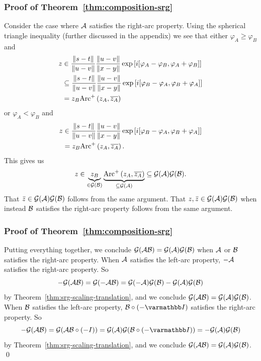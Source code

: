 \documentclass[10pt,mathserif]{beamer}
\begin{document}
\begin{frame}[plain]
\frametitle{Proof of Theorem~\ref{thm:composition-srg}}
Consider the case where ${\mathcal{A}}$ satisfies the right-arc property.
Using the spherical triangle inequality (further discussed in the appendix)
we see that either $\varphi_A\ge \varphi_B$ and 
\begin{align*}
z&\in \frac{\|s-t\|}{\|u-v\|}
\frac{\|u-v\|}{\|x-y\|}
\exp\left[i[\varphi_A-\varphi_B,\varphi_A+\varphi_B]\right]\\
&\subseteq
\frac{\|s-t\|}{\|u-v\|}
\frac{\|u-v\|}{\|x-y\|}
\exp\left[i[\varphi_B-\varphi_A,\varphi_B+\varphi_A]\right]\\
&=
z_B
\mathrm{Arc}^+\left(
z_A,\overline{z_A}
\right)
\end{align*}
or $\varphi_A< \varphi_B$ and 
\begin{align*}
z&\in 
\frac{\|s-t\|}{\|u-v\|}
\frac{\|u-v\|}{\|x-y\|}
\exp\left[i[\varphi_B-\varphi_A,\varphi_B+\varphi_A]\right]\\
&=z_B
\mathrm{Arc}^+\left(
z_A,\overline{z_A}
\right).
\end{align*}
This gives us
\vspace{-0.1in}
\[
z\in 
\underbrace{
z_B}_{\in {\mathcal{G}}({\mathcal{B}})}
\underbrace{\mathrm{Arc}^+\left(
z_A,\overline{z_A}\right)
}_{\subseteq  {\mathcal{G}}({\mathcal{A}})}
\subseteq {\mathcal{G}}({\mathcal{A}}){\mathcal{G}}({\mathcal{B}}).
\]
That $\bar{z}\in {\mathcal{G}}({\mathcal{A}}){\mathcal{G}}({\mathcal{B}})$ follows from the same argument.
That $z,\bar{z}\in {\mathcal{G}}({\mathcal{A}}){\mathcal{G}}({\mathcal{B}})$ when instead ${\mathcal{B}}$ satisfies the right-arc property follows from the same argument.
\end{frame}

\begin{frame}
\frametitle{Proof of Theorem~\ref{thm:composition-srg}}
Putting everything together, we conclude ${\mathcal{G}}({\mathcal{A}}{\mathcal{B}})= {\mathcal{G}}({\mathcal{A}}){\mathcal{G}}({\mathcal{B}})$
when ${\mathcal{A}}$ or ${\mathcal{B}}$ satisfies the right-arc property.
When ${\mathcal{A}}$ satisfies the left-arc property, $-{\mathcal{A}}$ satisfies the right-arc property.
So 
\[
-{\mathcal{G}}({\mathcal{A}}{\mathcal{B}})=
{\mathcal{G}}(-{\mathcal{A}}{\mathcal{B}})={\mathcal{G}}(-{\mathcal{A}}){\mathcal{G}}({\mathcal{B}})
-{\mathcal{G}}({\mathcal{A}}){\mathcal{G}}({\mathcal{B}})
\]
by Theorem~\ref{thm:srg-scaling-translation},
and we conclude ${\mathcal{G}}({\mathcal{A}}{\mathcal{B}})={\mathcal{G}}({\mathcal{A}}){\mathcal{G}}({\mathcal{B}})$.
When ${\mathcal{B}}$ satisfies the left-arc property,  $\cB\circ(-\opI)$ satisfies the right-arc property.
So 
\[
-\cG(\cA\cB)=
\cG(\cA\cB\circ(-I))=\cG(\cA)\cG(\cB\circ(-\opI))
=
-\cG(\cA)\cG(\cB)
\]
by Theorem~\ref{thm:srg-scaling-translation},
and we conclude ${\mathcal{G}}({\mathcal{A}}{\mathcal{B}})={\mathcal{G}}({\mathcal{A}}){\mathcal{G}}({\mathcal{B}})$.
\qed
\end{frame}
\end{document}
